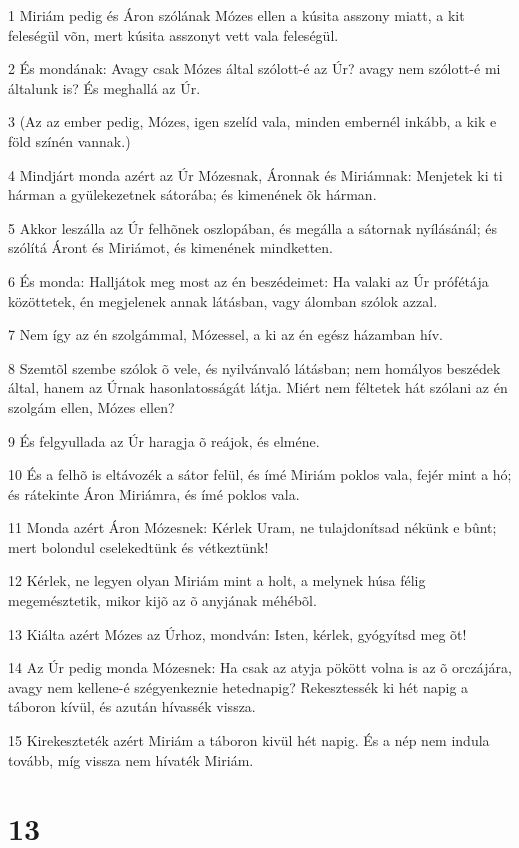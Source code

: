 \par 1 Miriám pedig és Áron szólának Mózes ellen a kúsita asszony miatt, a kit feleségül võn, mert kúsita asszonyt vett vala feleségül.
\par 2 És mondának: Avagy csak Mózes által szólott-é az Úr? avagy nem szólott-é mi általunk is? És meghallá az Úr.
\par 3 (Az az ember pedig, Mózes, igen szelíd vala, minden embernél inkább, a kik e föld színén vannak.)
\par 4 Mindjárt monda azért az Úr Mózesnak, Áronnak és Miriámnak: Menjetek ki ti hárman a gyülekezetnek sátorába; és kimenének õk hárman.
\par 5 Akkor leszálla az Úr felhõnek oszlopában, és megálla a sátornak nyílásánál; és szólítá Áront és Miriámot, és kimenének mindketten.
\par 6 És monda: Halljátok meg most az én beszédeimet: Ha valaki az Úr prófétája közöttetek, én megjelenek annak látásban, vagy álomban szólok azzal.
\par 7 Nem így az én szolgámmal, Mózessel, a ki az én egész házamban hív.
\par 8 Szemtõl szembe szólok õ vele, és nyilvánvaló látásban; nem homályos beszédek által, hanem az Úrnak hasonlatosságát látja. Miért nem féltetek hát szólani az én szolgám ellen, Mózes ellen?
\par 9 És felgyullada az Úr haragja õ reájok, és elméne.
\par 10 És a felhõ is eltávozék a sátor felül, és ímé Miriám poklos vala, fejér mint a hó; és rátekinte Áron Miriámra, és ímé poklos vala.
\par 11 Monda azért Áron Mózesnek: Kérlek Uram, ne tulajdonítsad nékünk e bûnt; mert bolondul cselekedtünk és vétkeztünk!
\par 12 Kérlek, ne legyen olyan Miriám mint a holt, a melynek húsa félig megemésztetik, mikor kijõ az õ anyjának méhébõl.
\par 13 Kiálta azért Mózes az Úrhoz, mondván: Isten, kérlek, gyógyítsd meg õt!
\par 14 Az Úr pedig monda Mózesnek: Ha csak az atyja pökött volna is az õ orczájára, avagy nem kellene-é szégyenkeznie hetednapig? Rekesztessék ki hét napig a táboron kívül, és azután hívassék vissza.
\par 15 Kirekeszteték azért Miriám a táboron kivül hét napig. És a nép nem indula tovább, míg vissza nem hívaték Miriám.

\chapter{13}

